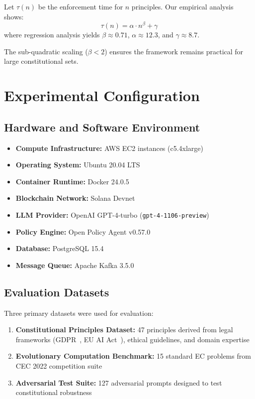 Let $\tau(n)$ be the enforcement time for $n$ principles. Our empirical analysis shows:
\[\tau(n) = \alpha \cdot n^{\beta} + \gamma\]
where regression analysis yields $\beta \approx 0.71$, $\alpha \approx 12.3$\ms{}, and $\gamma \approx 8.7$\ms{}.

The sub-quadratic scaling ($\beta < 2$) ensures the framework remains practical for large constitutional sets.

\section{Experimental Configuration}\label{sec:appendix_experimental}

\subsection{Hardware and Software Environment}
\begin{itemize}[leftmargin=*,topsep=2pt,itemsep=2pt,parsep=0pt]
    \item \textbf{Compute Infrastructure:} AWS EC2 instances (c5.4xlarge)
    \item \textbf{Operating System:} Ubuntu 20.04 LTS
    \item \textbf{Container Runtime:} Docker 24.0.5
    \item \textbf{Blockchain Network:} Solana Devnet
    \item \textbf{LLM Provider:} OpenAI GPT-4-turbo (\texttt{gpt-4-1106-preview}) %
    \item \textbf{Policy Engine:} Open Policy Agent v0.57.0
    \item \textbf{Database:} PostgreSQL 15.4
    \item \textbf{Message Queue:} Apache Kafka 3.5.0
\end{itemize}

\subsection{Evaluation Datasets}
Three primary datasets were used for evaluation:

\begin{enumerate}
    \item \textbf{Constitutional Principles Dataset:} 47 principles derived from legal frameworks (GDPR~\cite{gdpr2016}, EU AI Act~\cite{eu2024ai}), ethical guidelines, and domain expertise
    \item \textbf{Evolutionary Computation Benchmark:} 15 standard EC problems from CEC 2022 competition suite
    \item \textbf{Adversarial Test Suite:} 127 adversarial prompts designed to test constitutional robustness
\end{enumerate}

